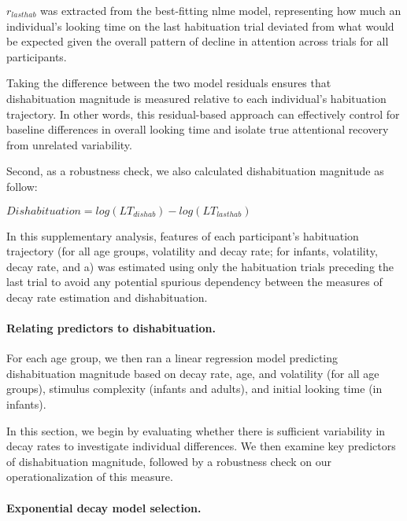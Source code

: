 \documentclass[10pt, letterpaper]{article}
\begin{document}
\(r_{lasthab}\) was extracted from the best-fitting nlme model,
representing how much an individual's looking time on the last
habituation trial deviated from what would be expected given the overall
pattern of decline in attention across trials for all participants.

Taking the difference between the two model residuals ensures that
dishabituation magnitude is measured relative to each individual's
habituation trajectory. In other words, this residual-based approach can
effectively control for baseline differences in overall looking time and
isolate true attentional recovery from unrelated variability.

Second, as a robustness check, we also calculated dishabituation
magnitude as follow:

\(Dishabituation = log(LT_{dishab}) - log(LT_{lasthab})\)

In this supplementary analysis, features of each participant's
habituation trajectory (for all age groups, volatility and decay rate;
for infants, volatility, decay rate, and a) was estimated using only the
habituation trials preceding the last trial to avoid any potential
spurious dependency between the measures of decay rate estimation and
dishabituation.

\hypertarget{relating-predictors-to-dishabituation.}{%
\paragraph{Relating predictors to
dishabituation.}\label{relating-predictors-to-dishabituation.}}

For each age group, we then ran a linear regression model predicting
dishabituation magnitude based on decay rate, age, and volatility (for
all age groups), stimulus complexity (infants and adults), and initial
looking time (in infants).

In this section, we begin by evaluating whether there is sufficient
variability in decay rates to investigate individual differences. We
then examine key predictors of dishabituation magnitude, followed by a
robustness check on our operationalization of this measure.

\hypertarget{exponential-decay-model-selection.}{%
\paragraph{Exponential decay model
selection.}\label{exponential-decay-model-selection.}}
\end{document}

